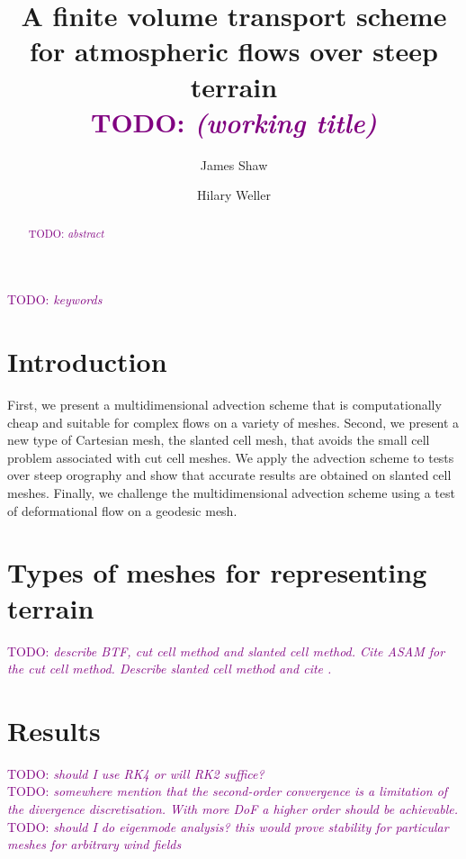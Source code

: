 \documentclass[times]{elsarticle}
\newcommand{\TODO}[1]{\textcolor{purple}{TODO: \emph{#1}}}
\begin{document}
\begin{frontmatter}
\title{A finite volume transport scheme for atmospheric flows over steep terrain \\ \TODO{(working title)}}
\author[uor]{James Shaw}
\author[uor]{Hilary Weller}

\address[uor]{Department of Meteorology, University of Reading, Reading, United Kingdom}

\begin{abstract}
	\TODO{abstract}
\end{abstract}

\begin{keyword}
	\TODO{keywords}
\end{keyword}
\end{frontmatter}

\section{Introduction}

First, we present a multidimensional advection scheme that is computationally cheap and suitable for complex flows on a variety of meshes.  Second, we present a new type of Cartesian mesh, the slanted cell mesh, that avoids the small cell problem associated with cut cell meshes.   We apply the advection scheme to tests over steep orography and show that accurate results are obtained on slanted cell meshes.  Finally, we challenge the multidimensional advection scheme using a test of deformational flow on a geodesic mesh.

\section{Types of meshes for representing terrain}
\label{sec:meshes}

\TODO{describe BTF, cut cell method and slanted cell method.  Cite ASAM for the cut cell method.  Describe slanted cell method and cite \citep{shaw-weller2016}.}




\section{Results}
\TODO{should I use RK4 or will RK2 suffice?} \\
\TODO{somewhere mention that the second-order convergence is a limitation of the divergence discretisation.  With more DoF a higher order should be achievable.} \\
\TODO{should I do eigenmode analysis?  this would prove stability for particular meshes for arbitrary wind fields}
\end{document}
